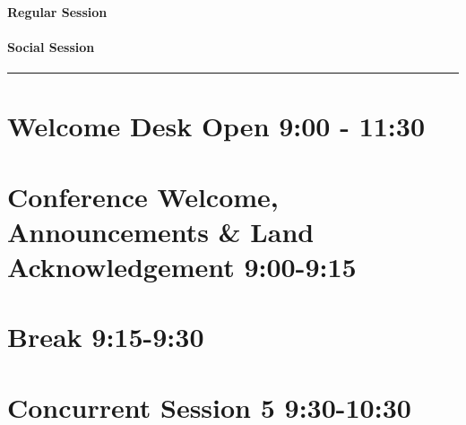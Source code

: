 \documentclass[
]{book}
\begin{document}
\begin{session}
\hypertarget{regular-session}{%
\paragraph{Regular Session}\label{regular-session}}
\end{session}
\begin{social}
\hypertarget{social-session}{%
\paragraph{Social Session}\label{social-session}}
\end{social}

\begin{center}\rule{0.5\linewidth}{0.5pt}\end{center}

\hypertarget{welcome-desk-open-900---1130}{%
\section*{Welcome Desk Open \textbar{} 9:00 - 11:30}\label{welcome-desk-open-900---1130}}

\hypertarget{conference-welcome-announcements-land-acknowledgement-900-915}{%
\section*{Conference Welcome, Announcements \& Land Acknowledgement \textbar{} 9:00-9:15}\label{conference-welcome-announcements-land-acknowledgement-900-915}}

\hypertarget{break-915-930}{%
\section*{Break \textbar{} 9:15-9:30}\label{break-915-930}}

\hypertarget{concurrent-session-5-930-1030}{%
\section*{Concurrent Session 5 \textbar{} 9:30-10:30}\label{concurrent-session-5-930-1030}}
\end{document}
